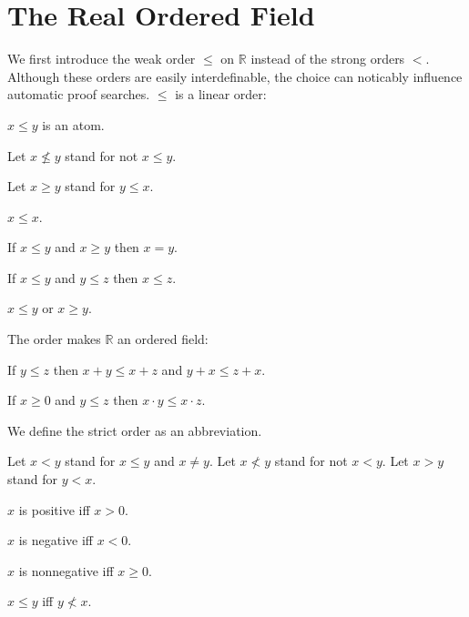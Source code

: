 \documentclass{article}
\begin{document}
\section{The Real Ordered Field}

We first introduce the weak order $\leq$ on $\mathbb{R}$ 
instead of
the strong orders $<$. Although these orders are easily
interdefinable, the choice can noticably influence automatic
proof searches. $\leq$ is a linear order:

\begin{forthel}

\begin{signature}
$x \leq y$ is an atom.
\end{signature}

Let $x \nleq y$ stand for not $x \leq y$.

Let $x \geq y$ stand for $y \leq x$.

\begin{axiom}
$x \leq x$.
\end{axiom}

\begin{axiom}
If $x \leq y$ and $x \geq y$ then $x=y$.
\end{axiom}

\begin{axiom}
If $x \leq y$ and $y \leq z$ then $x \leq z$.
\end{axiom}

\begin{axiom}
$x \leq y$ or $x \geq y$.
\end{axiom}

\end{forthel}
The order makes $\mathbb{R}$ an ordered field:
\begin{forthel}
\begin{axiom}
If $y \leq z$ then $x + y \leq x + z$ and $y + x \leq z + x$.
\end{axiom}

\begin{axiom}[1 17 ii]
If $x \geq 0$ and $y \leq z$ then $x \cdot y \leq x \cdot z$.
\end{axiom}
\end{forthel}
We define the strict order as an abbreviation.
\begin{forthel}
Let $x < y$ stand for $x \leq y$ and $x \neq y$.
Let $x \nless y$ stand for not $x < y$.
Let $x > y$ stand for $y < x$.

\begin{definition}
$x$ is positive iff $x > 0$.
\end{definition}

\begin{definition}
$x$ is negative iff $x < 0$.
\end{definition}

\begin{definition}
$x$ is nonnegative iff $x \geq 0$.
\end{definition}

\begin{lemma}
$x \leq y$ iff $y \nless x$.
\end{lemma}
\end{forthel}
\end{document}
